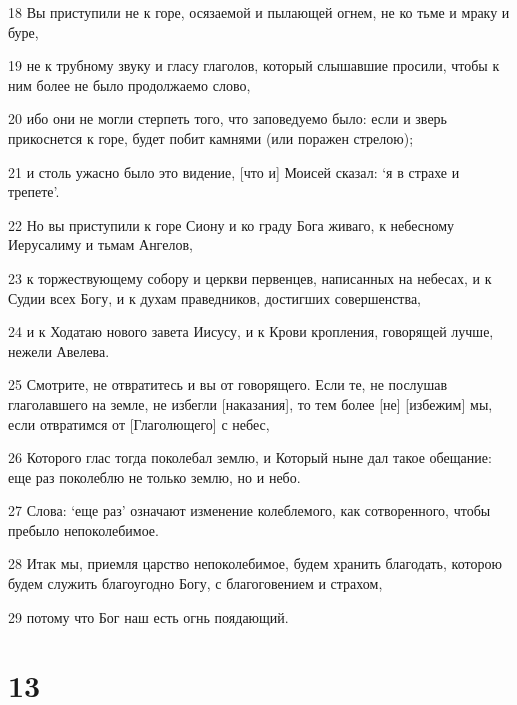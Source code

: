 \par 18 Вы приступили не к горе, осязаемой и пылающей огнем, не ко тьме и мраку и буре,
\par 19 не к трубному звуку и гласу глаголов, который слышавшие просили, чтобы к ним более не было продолжаемо слово,
\par 20 ибо они не могли стерпеть того, что заповедуемо было: если и зверь прикоснется к горе, будет побит камнями (или поражен стрелою);
\par 21 и столь ужасно было это видение, [что и] Моисей сказал: `я в страхе и трепете'.
\par 22 Но вы приступили к горе Сиону и ко граду Бога живаго, к небесному Иерусалиму и тьмам Ангелов,
\par 23 к торжествующему собору и церкви первенцев, написанных на небесах, и к Судии всех Богу, и к духам праведников, достигших совершенства,
\par 24 и к Ходатаю нового завета Иисусу, и к Крови кропления, говорящей лучше, нежели Авелева.
\par 25 Смотрите, не отвратитесь и вы от говорящего. Если те, не послушав глаголавшего на земле, не избегли [наказания], то тем более [не] [избежим] мы, если отвратимся от [Глаголющего] с небес,
\par 26 Которого глас тогда поколебал землю, и Который ныне дал такое обещание: еще раз поколеблю не только землю, но и небо.
\par 27 Слова: `еще раз' означают изменение колеблемого, как сотворенного, чтобы пребыло непоколебимое.
\par 28 Итак мы, приемля царство непоколебимое, будем хранить благодать, которою будем служить благоугодно Богу, с благоговением и страхом,
\par 29 потому что Бог наш есть огнь поядающий.

\chapter{13}


